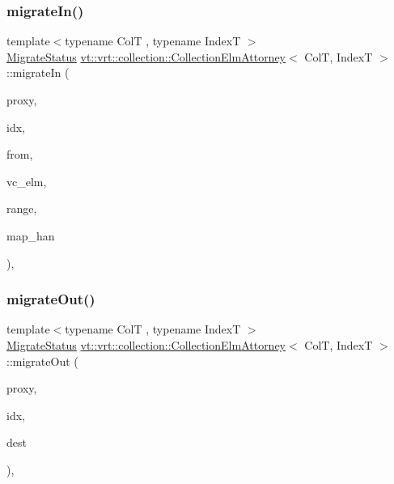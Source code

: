 \subsubsection{\texorpdfstring{migrate\+In()}{migrateIn()}}
{\footnotesize\ttfamily template$<$typename ColT , typename IndexT $>$ \\
\hyperlink{namespacevt_1_1vrt_1_1collection_ad221ad8aea9e586689b4335f5bcd9804}{Migrate\+Status} \hyperlink{structvt_1_1vrt_1_1collection_1_1_collection_elm_attorney}{vt\+::vrt\+::collection\+::\+Collection\+Elm\+Attorney}$<$ ColT, IndexT $>$\+::migrate\+In (\begin{DoxyParamCaption}\item[{\hyperlink{namespacevt_a1b417dd5d684f045bb58a0ede70045ac}{Virtual\+Proxy\+Type} const \&}]{proxy,  }\item[{IndexT const \&}]{idx,  }\item[{\hyperlink{namespacevt_a866da9d0efc19c0a1ce79e9e492f47e2}{Node\+Type} const \&}]{from,  }\item[{\hyperlink{structvt_1_1vrt_1_1collection_1_1_collection_elm_attorney_a36fe2c7f590baec1038c592db59a6315}{Virtual\+Ptr\+Type}}]{vc\+\_\+elm,  }\item[{IndexT const \&}]{range,  }\item[{\hyperlink{namespacevt_af64846b57dfcaf104da3ef6967917573}{Handler\+Type} const}]{map\+\_\+han }\end{DoxyParamCaption})\hspace{0.3cm}{\ttfamily [static]}, {\ttfamily [private]}}

\mbox{\label{structvt_1_1vrt_1_1collection_1_1_collection_elm_attorney_a672eb9e913410235692033f5b7ea24b5}} 
\subsubsection{\texorpdfstring{migrate\+Out()}{migrateOut()}}
{\footnotesize\ttfamily template$<$typename ColT , typename IndexT $>$ \\
\hyperlink{namespacevt_1_1vrt_1_1collection_ad221ad8aea9e586689b4335f5bcd9804}{Migrate\+Status} \hyperlink{structvt_1_1vrt_1_1collection_1_1_collection_elm_attorney}{vt\+::vrt\+::collection\+::\+Collection\+Elm\+Attorney}$<$ ColT, IndexT $>$\+::migrate\+Out (\begin{DoxyParamCaption}\item[{\hyperlink{namespacevt_a1b417dd5d684f045bb58a0ede70045ac}{Virtual\+Proxy\+Type} const \&}]{proxy,  }\item[{IndexT const \&}]{idx,  }\item[{\hyperlink{namespacevt_a866da9d0efc19c0a1ce79e9e492f47e2}{Node\+Type} const \&}]{dest }\end{DoxyParamCaption})\hspace{0.3cm}{\ttfamily [static]}, {\ttfamily [private]}}



